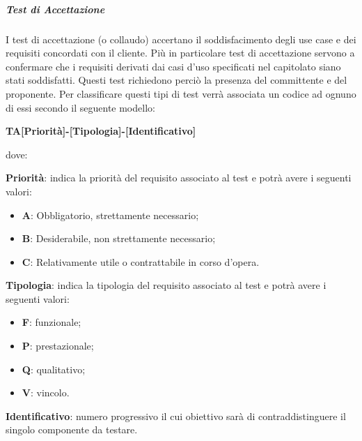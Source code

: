         \subparagraph*{Test di Accettazione}
            	I test di accettazione (o collaudo) accertano il soddisfacimento degli use case e dei requisiti concordati con il cliente.
                Più in particolare test di accettazione servono a confermare che i requisiti derivati dai casi d'uso specificati nel capitolato siano stati soddisfatti. Questi test richiedono perciò la presenza del committente e del proponente.  
                Per classificare questi tipi di test verrà associata un codice ad ognuno di essi secondo il seguente modello:
                
                \begin{center}
                \textbf{TA[Priorità]-[Tipologia]-[Identificativo]}
                \end{center}
                dove: 
                
                \textbf{Priorità}: indica la priorità del requisito associato al test e potrà avere i seguenti valori:
                \begin{itemize}
                    \item \textbf{A}: Obbligatorio, strettamente necessario;
                    \item \textbf{B}: Desiderabile, non strettamente necessario;
                    \item \textbf{C}: Relativamente utile o contrattabile in corso d'opera. 
                 \end{itemize} 
                 \textbf{Tipologia}: indica la tipologia del requisito associato al test e potrà avere i seguenti valori:
                 \begin{itemize}
                    \item \textbf{F}: funzionale;
                    \item \textbf{P}: prestazionale;
                    \item \textbf{Q}: qualitativo;
                    \item \textbf{V}: vincolo.
                 \end{itemize}
                \textbf{Identificativo}: numero progressivo il cui obiettivo sarà di contraddistinguere il singolo componente da testare.
